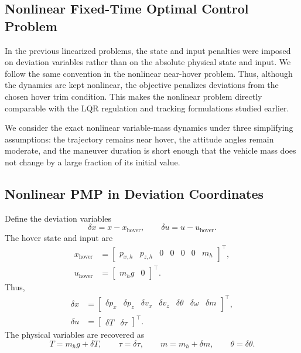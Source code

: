 
\subsection{Nonlinear Fixed-Time Optimal Control Problem}

In the previous linearized problems, the state and input penalties were imposed on deviation variables rather than on the absolute physical state and input. We follow the same convention in the nonlinear near-hover problem. Thus, although the dynamics are kept nonlinear, the objective penalizes deviations from the chosen hover trim condition. This makes the nonlinear problem directly comparable with the LQR regulation and tracking formulations studied earlier.

We consider the exact nonlinear variable-mass dynamics under three simplifying assumptions: the trajectory remains near hover, the attitude angles remain moderate, and the maneuver duration is short enough that the vehicle mass does not change by a large fraction of its initial value.

\subsection{Nonlinear PMP in Deviation Coordinates}

Define the deviation variables
\begin{equation}
    \delta x = x - x_{\mathrm{hover}},
    \qquad
    \delta u = u - u_{\mathrm{hover}}.
\end{equation}
The hover state and input are
\begin{align}
    x_{\mathrm{hover}}
    &=
    \begin{bmatrix}
        p_{x,h} & p_{z,h} & 0 & 0 & 0 & 0 & m_h
    \end{bmatrix}^{\top},\\
    u_{\mathrm{hover}}
    &=
    \begin{bmatrix}
        m_h g & 0
    \end{bmatrix}^{\top}.
\end{align}
Thus,
\begin{align}
    \delta x
    &=
    \begin{bmatrix}
        \delta p_x &
        \delta p_z &
        \delta v_x &
        \delta v_z &
        \delta\theta &
        \delta\omega &
        \delta m
    \end{bmatrix}^{\top},
    \\
    \delta u
    &=
    \begin{bmatrix}
        \delta T &
        \delta\tau
    \end{bmatrix}^{\top}.
\end{align}
The physical variables are recovered as
\begin{equation}
    T = m_h g + \delta T,
    \qquad
    \tau = \delta\tau,
    \qquad
    m = m_h + \delta m,
    \qquad
    \theta = \delta\theta.
\end{equation}


